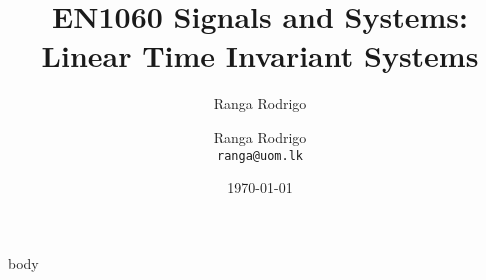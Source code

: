 \documentclass[t, aspectratio=169,xcolor={svgnames}, 10pt]{beamer}
\title{EN1060 Signals and Systems: Linear Time Invariant Systems}
\author{Ranga Rodrigo}
\author[]{Ranga Rodrigo\\ \texttt{ranga@uom.lk}}
\institute[]{The University of Moratuwa, Sri Lanka}
\date{\today}
\begin{document}
    \begin{frame}
        \titlepage
    \end{frame}







    
    {body}












\end{document}
